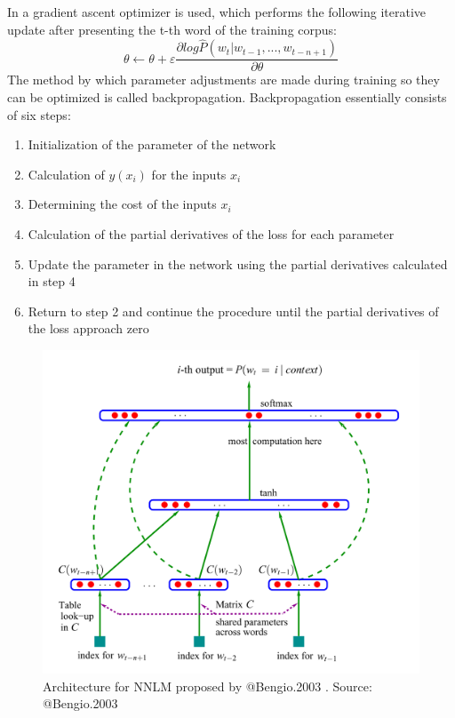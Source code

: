 \documentclass[]{krantz}
\providecommand{\tightlist}{%
  \setlength{\itemsep}{0pt}\setlength{\parskip}{0pt}}
\begin{document}
In \citet{Bengio.2003} a gradient ascent optimizer is used, which performs the following iterative update after presenting the t-th word of the training corpus:
\[\theta \leftarrow  \theta + \varepsilon\frac{\partial log\widehat{P}(w_t|w_{t-1},...,w_{t-n+1})}{\partial \theta }\]
The method by which parameter adjustments are made during training so they can be optimized is called backpropagation. Backpropagation essentially consists of six steps:

\begin{enumerate}
\def\labelenumi{\arabic{enumi}.}
\tightlist
\item
  Initialization of the parameter of the network
\item
  Calculation of \(y(x_i)\) for the inputs \(x_i\)
\item
  Determining the cost of the inputs \(x_i\)
\item
  Calculation of the partial derivatives of the loss for each parameter
\item
  Update the parameter in the network using the partial derivatives calculated in step 4
\item
  Return to step 2 and continue the procedure until the partial derivatives of the loss approach zero
\end{enumerate}

\begin{figure}
\includegraphics[width=\textwidth]{figures/01-01-foundations-applications-of-modern-NLP/01-01_bengio_nnlm} \caption{Architecture for NNLM proposed by @Bengio.2003 .  Source: @Bengio.2003}\label{fig:bengio-nnlm}
\end{figure}
\end{document}
